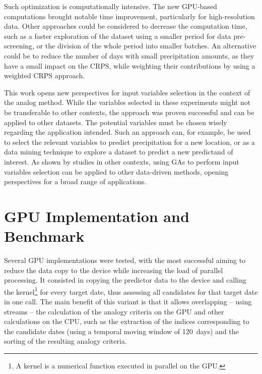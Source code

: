 \documentclass[draft]{agujournal2019}
\begin{document}
Such optimization is computationally intensive. The new GPU-based computations brought notable time improvement, particularly for high-resolution data. Other approaches could be considered to decrease the computation time, such as a faster exploration of the dataset using a smaller period for data pre-screening, or the division of the whole period into smaller batches. An alternative could be to reduce the number of days with small precipitation amounts, as they have a small impact on the CRPS, while weighting their contributions by using a weighted CRPS approach.

This work opens new perspectives for input variables selection in the context of the analog method. While the variables selected in these experiments might not be transferable to other contexts, the approach was proven successful and can be applied to other datasets. The potential variables must be chosen wisely regarding the application intended. Such an approach can, for example, be used to select the relevant variables to predict precipitation for a new location, or as a data mining technique to explore a dataset to predict a new predictand of interest. As shown by studies in other contexts, using GAs to perform input variables selection can be applied to other data-driven methods, opening perspectives for a broad range of applications.


%
%

\FloatBarrier

\appendix

\section{GPU Implementation and Benchmark}

Several GPU implementations were tested, with the most successful aiming to reduce the data copy to the device while increasing the load of parallel processing. It consisted in copying the predictor data to the device and calling the kernel\footnote{A kernel is a numerical function executed in parallel on the GPU.} for every target date, thus assessing all candidates for that target date in one call. The main benefit of this variant is that it allows overlapping -- using streams -- the calculation of the analogy criteria on the GPU and other calculations on the CPU, such as the extraction of the indices corresponding to the candidate dates (using a temporal moving window of 120~days) and the sorting of the resulting analogy criteria.
\end{document}
